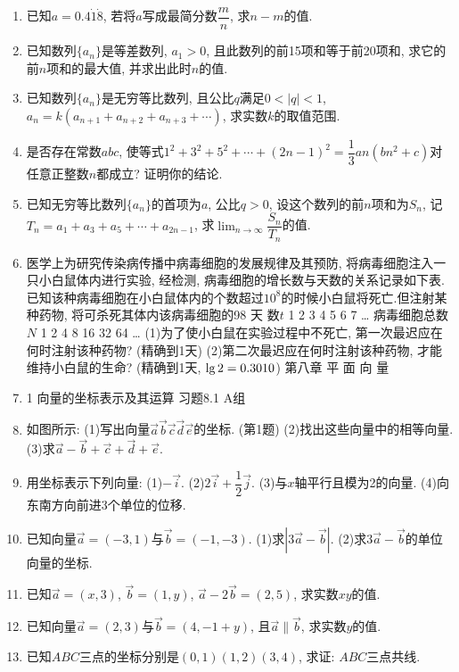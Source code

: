 \documentclass[10pt,a4paper]{article}
\begin{document}
\begin{enumerate}[1.]
\item 已知$a=0.4\dot1\dot8$, 若将$a$写成最简分数$\dfrac mn$, 求$n-m$的值.
\item 已知数列$\{a_n\}$是等差数列, $a_1>0$, 且此数列的前15项和等于前20项和, 求它的前$n$项和的最大值, 并求出此时$n$的值.
\item 已知数列$\{a_n\}$是无穷等比数列, 且公比$q$满足$0<|q|<1$, $a_n=k(a_{n+1}+a_{n+2}+a_{n+3}+\cdots)$, 求实数$k$的取值范围.
\item 是否存在常数$abc$, 使等式$1^2+3^2+5^2+\cdots +(2n-1)^2=\dfrac 13an(bn^2+c)$对任意正整数$n$都成立? 证明你的结论.
\item 已知无穷等比数列$\{a_n\}$的首项为$a$, 公比$q>0$, 设这个数列的前$n$项和为$S_n$, 记$T_n=a_1+a_3+a_5+\cdots +a_{2n-1}$, 求$\displaystyle\lim_{n\to\infty}\dfrac{S_n}{T_n}$的值.
\item 医学上为研究传染病传播中病毒细胞的发展规律及其预防, 将病毒细胞注入一只小白鼠体内进行实验, 经检测, 病毒细胞的增长数与天数的关系记录如下表.已知该种病毒细胞在小白鼠体内的个数超过$10^8$的时候小白鼠将死亡.但注射某种药物, 将可杀死其体内该病毒细胞的98%
天  数$t$	1	2	3	4	5	6	7	…
病毒细胞总数$N$	1	2	4	8	16	32	64	…
(1)为了使小白鼠在实验过程中不死亡, 第一次最迟应在何时注射该种药物? (精确到1天)
(2)第二次最迟应在何时注射该种药物, 才能维持小白鼠的生命? (精确到1天, $\lg 2=0.301\text0$)
第八章  平 面 向 量
\item 1  向量的坐标表示及其运算
习题8.1  A组
\item 如图所示:
(1)写出向量$\overrightarrow a\overrightarrow b\overrightarrow c\overrightarrow d\overrightarrow e$的坐标.
(第1题)
(2)找出这些向量中的相等向量.
(3)求$\overrightarrow a-\overrightarrow b+\overrightarrow c+\overrightarrow d+\overrightarrow e$.
\item 用坐标表示下列向量:
(1)$-\overrightarrow i$.								(2)$2\overrightarrow i+\dfrac 12\overrightarrow j$.
(3)与$x$轴平行且模为2的向量.			(4)向东南方向前进3个单位的位移.
\item 已知向量$\overrightarrow a=(-3,1)$与$\overrightarrow b=(-1,-3)$.
(1)求$|3\overrightarrow a-\overrightarrow b|$.
(2)求$3\overrightarrow a-\overrightarrow b$的单位向量的坐标.
\item 已知$\overrightarrow a=(x,3)$, $\overrightarrow b=(1,y)$, $\overrightarrow a-2\overrightarrow b=(2,5)$, 求实数$xy$的值.
\item 已知向量$\overrightarrow a=(2,3)$与$\overrightarrow b=(4,-1+y)$, 且$\overrightarrow a\parallel \overrightarrow b$, 求实数$y$的值.
\item 已知$ABC$三点的坐标分别是$(0,1)(1,2)(3,4)$, 求证: $ABC$三点共线.

\end{enumerate}
\end{document}
